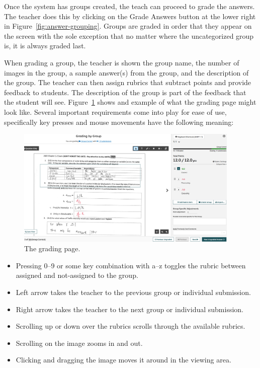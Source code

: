 \documentclass[ms,twoside,print]{nuthesis}
\begin{document}
Once the system has groups created, the teach can proceed to grade the answers. The teacher does this by clicking on the Grade Answers button at the lower right in Figure~\ref{fig:answer-grouping}. Groups are graded in order that they appear on the screen with the sole exception that no matter where the uncategorized group is, it is always graded last. 

When grading a group, the teacher is shown the group name, the number of images in the group, a sample answer(s) from the group, and the description of the group. The teacher can then assign rubrics that subtract points and provide feedback to students. The description of the group is part of the feedback that the student will see. Figure~\ref{fig:grading-answers} shows and example of what the grading page might look like. Several important requirements come into play for ease of use, specifically key presses and mouse movements have the following meaning:

\begin{figure}[htb]
    \centering
    \includegraphics[width=0.95\textwidth]{images/grading-answer.png}
    \caption{The grading page.}\label{fig:grading-answers}
\end{figure}

\begin{itemize}
    \item Pressing 0--9 or some key combination with a--z toggles the rubric between assigned and not-assigned to the group. 
    \item Left arrow takes the teacher to the previous group or individual submission.
    \item Right arrow takes the teacher to the next group or individual submission.
    \item Scrolling up or down over the rubrics scrolls through the available rubrics.
    \item Scrolling on the image zooms in and out.
    \item Clicking and dragging the image moves it around in the viewing area. 
\end{itemize}
\end{document}
